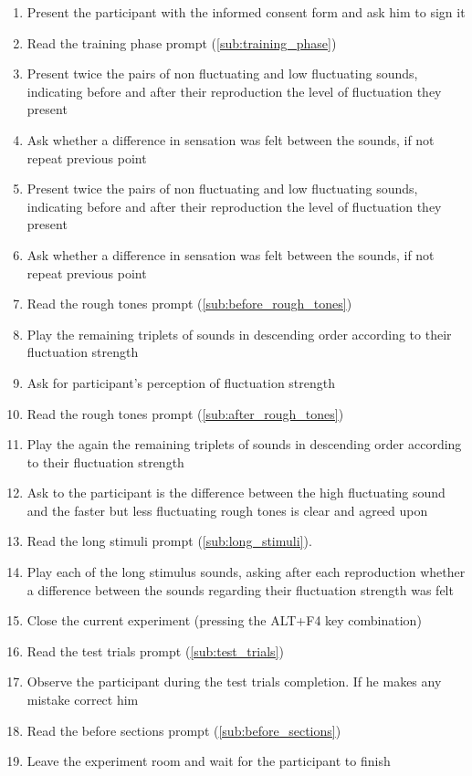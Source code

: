 \documentclass[a4paper]{article}
\begin{document}
\begin{enumerate}
  \item Present the participant with the informed consent form and ask him to
  sign it
  \item Read the training phase prompt (\ref{sub:training_phase})
  \item Present twice the pairs of non fluctuating and low fluctuating sounds,
  indicating before and after their reproduction the level of fluctuation they
  present
  \item Ask whether a difference in sensation was felt between the sounds, if
  not repeat previous point
  \item Present twice the pairs of non fluctuating and low fluctuating sounds,
  indicating before and after their reproduction the level of fluctuation they
  present
  \item Ask whether a difference in sensation was felt between the sounds, if
  not repeat previous point
  \item Read the rough tones prompt (\ref{sub:before_rough_tones})
  \item Play the remaining triplets of sounds in descending order according to
  their fluctuation strength
  \item Ask for participant's perception of fluctuation strength
  \item Read the rough tones prompt (\ref{sub:after_rough_tones})
  \item Play the again the remaining triplets of sounds in descending order
  according to their fluctuation strength
  \item Ask to the participant is the difference between the high fluctuating
  sound and the faster but less fluctuating rough tones is clear and agreed
  upon
  \item Read the long stimuli prompt (\ref{sub:long_stimuli}).
  \item Play each of the long stimulus sounds, asking after each reproduction
  whether a difference between the sounds regarding their fluctuation strength
  was felt
  \item Close the current experiment (pressing the ALT+F4 key combination)
  \item Read the test trials prompt (\ref{sub:test_trials})
  \item Observe the participant during the test trials completion. If he makes
  any mistake correct him
  \item Read the before sections prompt (\ref{sub:before_sections})
  \item Leave the experiment room and wait for the participant to finish
\end{enumerate}
\end{document}
